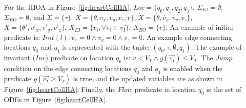For the \ac{HIOA} in Figure~\ref{fig:heartCellHA},
$Loc=\{q_{0},q_{1},q_{2},q_{3}\}$, $\Sigma_{EI} = \emptyset$,
$\Sigma_{EO}=\emptyset$, and
$\Sigma=\{\tau\}$. $X=\{\theta,v_{x},v_{y},v_{z},v\}$,
\mbox{$\dot{X}=\{\dot{\theta},\dot{v_{x}},\dot{v_{y}},\dot{v_{z}}\}$},
\mbox{$X=\{\theta',{v'_{x}},{v'_{y}},\dot{v'_{z}}\}$}.
$X_{EI}=\{v_{i}, \forall v_{i} \in \vec{v_{I}}\}$.  $X_{EO}=\{v\}$. An
example of initial predicate is:
$Init(l): v_{x}=0 \wedge v_{y}=0 \wedge v_{z}=0$. An example edge
connecting locations $q_{0}$ and $q_{1}$ is represented with the tuple:
$(q_{0},\tau,\emptyset,q_{1})$. The example of invariant ($Inv$)
predicate on location $q_{0}$ is:
$v < V_{T} \wedge g(\vec{v_{I}}) \leq V_{T}$. The $Jump$ condition on
the edge connecting locations $q_{0}$ and $q_{1}$ is enabled when the
predicate \mbox{$g(\vec{v_{I}} \geq V_{T})$} is true, and the updated
variables are as shown in Figure~\ref{fig:heartCellHA}. Finally, the
$Flow$ predicate in location $q_{0}$ is the set of ODEs in
Figure~\ref{fig:heartCellHA}.









